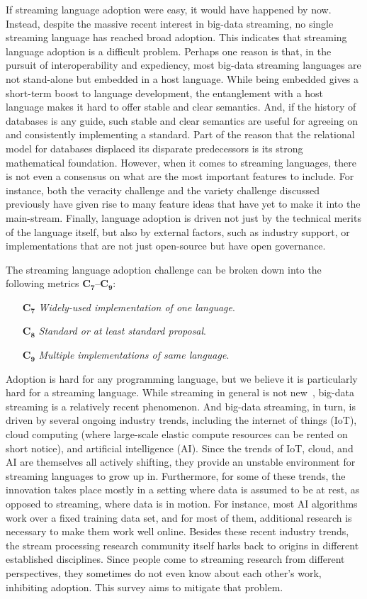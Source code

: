 If streaming language adoption were easy, it would have happened by
now. Instead, despite the massive recent interest in big-data
streaming, no single streaming language has reached broad adoption.
This indicates that streaming language adoption is a difficult
problem. Perhaps one reason is that, in the pursuit of
interoperability and expediency, most big-data streaming languages are
not stand-alone but embedded in a host language. While being embedded
gives a short-term boost to language development, the entanglement
with a host language makes it hard to offer stable and clear
semantics. And, if the history of databases is any guide, such stable
and clear semantics are useful for agreeing on and consistently
implementing a standard. Part of the reason that the relational model
for databases displaced its disparate predecessors is its strong
mathematical foundation. However, when it comes to streaming
languages, there is not even a consensus on what are the most
important features to include. For instance, both the veracity
challenge and the variety challenge discussed previously have given
rise to many feature ideas that have yet to make it into the
main-stream. Finally, language adoption is driven not just by the
technical merits of the language itself, but also by external factors,
such as industry support, or implementations that are not just
open-source but have open governance.

The streaming language adoption challenge can be broken down into the
following metrics $\mathbf{C_7}$--$\mathbf{C_9}$:
\begin{itemize}
  \item[$\mathbf{C_7}$] \emph{Widely-used implementation of one language}.
  \item[$\mathbf{C_8}$] \emph{Standard or at least standard proposal}.
  \item[$\mathbf{C_9}$] \emph{Multiple implementations of same language}.
\end{itemize}

Adoption is hard for any programming language, but we believe it is
particularly hard for a streaming language. While streaming in general
is not new~\cite{stephens_1997}, big-data streaming is a relatively
recent phenomenon. And big-data streaming, in turn, is driven by
several ongoing industry trends, including the internet of things
(IoT), cloud computing (where large-scale elastic compute resources
can be rented on short notice), and artificial intelligence
(AI). Since the trends of IoT, cloud, and AI are themselves all
actively shifting, they provide an unstable environment for streaming
languages to grow up in. Furthermore, for some of these trends, the
innovation takes place mostly in a setting where data is assumed to be
at rest, as opposed to streaming, where data is in motion. For
instance, most AI algorithms work over a fixed training data set, and
for most of them, additional research is necessary to make them work
well online. Besides these recent industry trends, the stream
processing research community itself harks back to origins in
different established disciplines.  Since people come to streaming
research from different perspectives, they sometimes do not even know
about each other's work, inhibiting adoption. This survey aims to
mitigate that problem.
